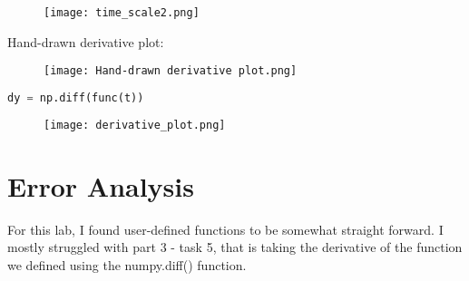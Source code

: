 \documentclass[12pt,a4paper]{article}
\begin{document}
\begin{itemize}
\begin{figure}[h]
    \centering
    \texttt{[image: time\_scale2.png]}
\end{figure}\textbf{}

    Hand-drawn derivative plot:\\
\begin{figure}[h]
    \centering
    \texttt{[image: Hand-drawn derivative plot.png]}
\end{figure}\textbf{}
\clearpage

\begin{lstlisting}[language=Python, caption={Derivative of user-defined function}, label={lst:code}, mathescape=true, breaklines=true]
dy = np.diff(func(t))

\end{lstlisting}

\begin{figure}[h]
    \centering
    \texttt{[image: derivative\_plot.png]}
\end{figure}\textbf{}

\end{itemize}
\section{Error Analysis}\label{sec:res}
    For this lab, I found user-defined functions to be somewhat straight forward. I mostly struggled with part 3 - task 5, that is taking the derivative of the function we defined using the numpy.diff() function.
\end{document}
